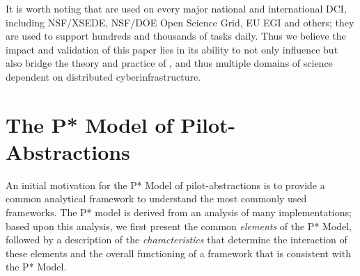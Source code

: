 \documentclass[conference]{IEEEtran}
\begin{document}
It is worth noting that \pilotjobs are used on every major national
and international DCI, including NSF/XSEDE, NSF/DOE Open Science Grid,
EU EGI and others; they are used to support hundreds and thousands of
tasks daily. Thus we believe the impact and validation of this paper
lies in its ability to not only influence but also bridge the theory
and practice of \pilotjobs, and thus multiple domains of science
dependent on distributed cyberinfrastructure.






\section{The P* Model of Pilot-\\Abstractions}
\label{sec:pilot-model}

An initial motivation for the P* Model of pilot-abstractions is to
provide a common analytical framework to understand the most commonly
used \pilotjob frameworks.  The P* model is derived from an analysis of many
\pilotjob implementations; based upon this analysis, we first present
the common {\it elements} of the P* Model, followed by a description
of the {\it characteristics} that determine the interaction of these
elements and the overall functioning of a \pilotjob framework that is
consistent with the P* Model.  
\end{document}
